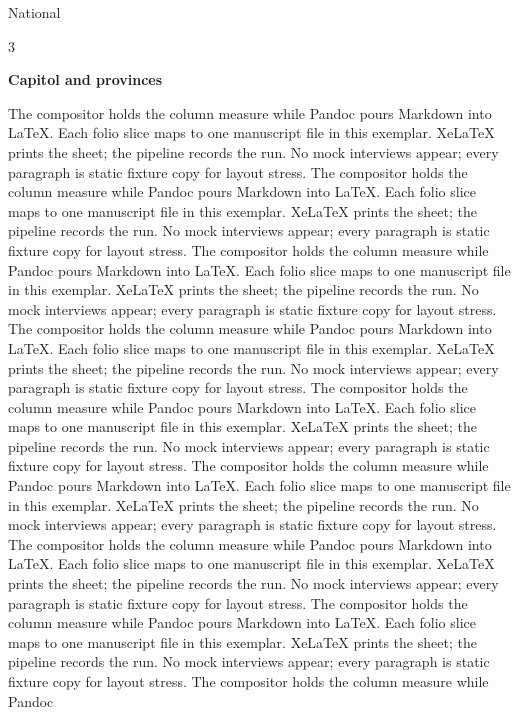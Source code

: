 \documentclass[
  ignorenonframetext,
]{beamer}
\author{\texorpdfstring{}{}}
\date{}
\begin{document}
\begin{frame}{National}
\protect{}\label{national}
\begin{multicols}{3}

\textbf{Capitol and provinces}

The compositor holds the column measure while Pandoc pours Markdown into
LaTeX. Each folio slice maps to one manuscript file in this exemplar.
XeLaTeX prints the sheet; the pipeline records the run. No mock
interviews appear; every paragraph is static fixture copy for layout
stress. The compositor holds the column measure while Pandoc pours
Markdown into LaTeX. Each folio slice maps to one manuscript file in
this exemplar. XeLaTeX prints the sheet; the pipeline records the run.
No mock interviews appear; every paragraph is static fixture copy for
layout stress. The compositor holds the column measure while Pandoc
pours Markdown into LaTeX. Each folio slice maps to one manuscript file
in this exemplar. XeLaTeX prints the sheet; the pipeline records the
run. No mock interviews appear; every paragraph is static fixture copy
for layout stress. The compositor holds the column measure while Pandoc
pours Markdown into LaTeX. Each folio slice maps to one manuscript file
in this exemplar. XeLaTeX prints the sheet; the pipeline records the
run. No mock interviews appear; every paragraph is static fixture copy
for layout stress. The compositor holds the column measure while Pandoc
pours Markdown into LaTeX. Each folio slice maps to one manuscript file
in this exemplar. XeLaTeX prints the sheet; the pipeline records the
run. No mock interviews appear; every paragraph is static fixture copy
for layout stress. The compositor holds the column measure while Pandoc
pours Markdown into LaTeX. Each folio slice maps to one manuscript file
in this exemplar. XeLaTeX prints the sheet; the pipeline records the
run. No mock interviews appear; every paragraph is static fixture copy
for layout stress. The compositor holds the column measure while Pandoc
pours Markdown into LaTeX. Each folio slice maps to one manuscript file
in this exemplar. XeLaTeX prints the sheet; the pipeline records the
run. No mock interviews appear; every paragraph is static fixture copy
for layout stress. The compositor holds the column measure while Pandoc
pours Markdown into LaTeX. Each folio slice maps to one manuscript file
in this exemplar. XeLaTeX prints the sheet; the pipeline records the
run. No mock interviews appear; every paragraph is static fixture copy
for layout stress. The compositor holds the column measure while Pandoc

\end{multicols}
\end{frame}
\end{document}
